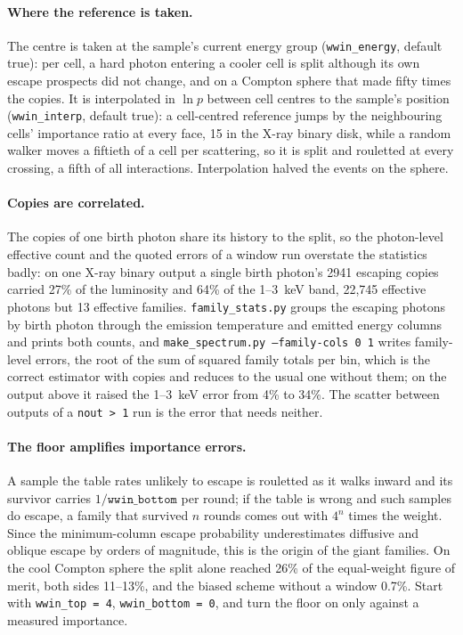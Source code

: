 \documentclass[11pt]{article}
\newcommand{\key}[1]{\texttt{#1}}
\begin{document}
\paragraph{Where the reference is taken.} The centre is taken at the sample's
current energy group (\key{wwin\_energy}, default true): per cell, a hard photon
entering a cooler cell is split although its own escape prospects did not change, and
on a Compton sphere that made fifty times the copies. It is interpolated in $\ln p$
between cell centres to the sample's position (\key{wwin\_interp}, default true): a
cell-centred reference jumps by the neighbouring cells' importance ratio at every face,
15 in the X-ray binary disk, while a random walker moves a fiftieth of a cell per
scattering, so it is split and rouletted at every crossing, a fifth of all interactions.
Interpolation halved the events on the sphere.

\paragraph{Copies are correlated.} The copies of one birth photon share its history to
the split, so the photon-level effective count and the quoted errors of a window run
overstate the statistics badly: on one X-ray binary output a single birth photon's 2941
escaping copies carried 27\% of the luminosity and 64\% of the 1--3~keV band, 22,745
effective photons but 13 effective families. \key{family\_stats.py} groups the
escaping photons by birth photon through the emission temperature and emitted energy
columns and prints both counts, and \key{make\_spectrum.py --family-cols 0 1} writes
family-level errors, the root of the sum of squared family totals per bin, which is the
correct estimator with copies and reduces to the usual one without them; on the output
above it raised the 1--3~keV error from 4\% to 34\%. The scatter between outputs of a
\key{nout > 1} run is the error that needs neither.

\paragraph{The floor amplifies importance errors.} A sample the table rates unlikely to
escape is rouletted as it walks inward and its survivor carries $1/\key{wwin\_bottom}$
per round; if the table is wrong and such samples do escape, a family that survived $n$
rounds comes out with $4^n$ times the weight. Since the minimum-column escape
probability underestimates diffusive and oblique escape by orders of magnitude, this is
the origin of the giant families. On the cool Compton sphere the split alone reached
26\% of the equal-weight figure of merit, both sides 11--13\%, and the biased scheme
without a window 0.7\%. Start with \key{wwin\_top = 4}, \key{wwin\_bottom = 0}, and
turn the floor on only against a measured importance.
\end{document}
